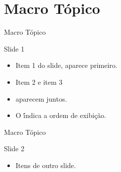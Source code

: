 \section{Macro Tópico}

\begin{frame}{Macro Tópico}{}
\begin{block}{Slide 1}
  \begin{itemize}
    \item<1-> Item 1 do slide, aparece primeiro.
    \item<2-> Item 2 e item 3
    \item<2-> aparecem juntos.
    \item<3-> O \'<n->\' indica a ordem de exibição.
  \end{itemize}
\end{block}
\end{frame}

\begin{frame}{Macro Tópico}
\begin{block}{Slide 2}
  \begin{itemize}
    \item<1-> Itens de outro slide.
  \end{itemize}
\end{block}
\end{frame}
